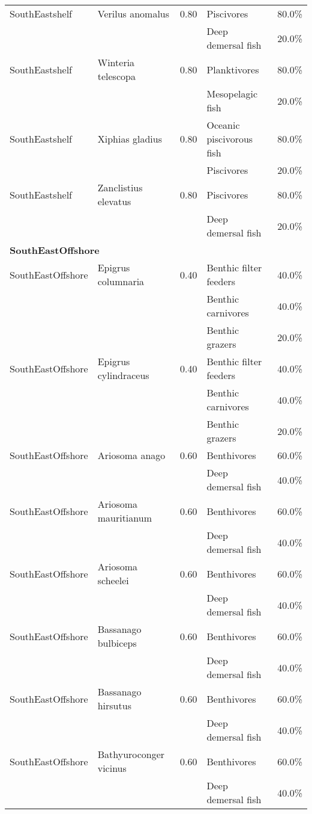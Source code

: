 \begin{longtable}{llcll}
\hline
SouthEastshelf & Verilus anomalus & 0.80 & Piscivores & 80.0\% \\
& & & Deep demersal fish & 20.0\% \\
\hline
SouthEastshelf & Winteria telescopa & 0.80 & Planktivores & 80.0\% \\
& & & Mesopelagic fish & 20.0\% \\
\hline
SouthEastshelf & Xiphias gladius & 0.80 & Oceanic piscivorous fish & 80.0\% \\
& & & Piscivores & 20.0\% \\
\hline
SouthEastshelf & Zanclistius elevatus & 0.80 & Piscivores & 80.0\% \\
& & & Deep demersal fish & 20.0\% \\
\hline
\hline
\multicolumn{5}{l}{\textbf{SouthEastOffshore}} \\
\hline
SouthEastOffshore & Epigrus columnaria & 0.40 & Benthic filter feeders & 40.0\% \\
& & & Benthic carnivores & 40.0\% \\
& & & Benthic grazers & 20.0\% \\
\hline
SouthEastOffshore & Epigrus cylindraceus & 0.40 & Benthic filter feeders & 40.0\% \\
& & & Benthic carnivores & 40.0\% \\
& & & Benthic grazers & 20.0\% \\
\hline
SouthEastOffshore & Ariosoma anago & 0.60 & Benthivores & 60.0\% \\
& & & Deep demersal fish & 40.0\% \\
\hline
SouthEastOffshore & Ariosoma mauritianum & 0.60 & Benthivores & 60.0\% \\
& & & Deep demersal fish & 40.0\% \\
\hline
SouthEastOffshore & Ariosoma scheelei & 0.60 & Benthivores & 60.0\% \\
& & & Deep demersal fish & 40.0\% \\
\hline
SouthEastOffshore & Bassanago bulbiceps & 0.60 & Benthivores & 60.0\% \\
& & & Deep demersal fish & 40.0\% \\
\hline
SouthEastOffshore & Bassanago hirsutus & 0.60 & Benthivores & 60.0\% \\
& & & Deep demersal fish & 40.0\% \\
\hline
SouthEastOffshore & Bathyuroconger vicinus & 0.60 & Benthivores & 60.0\% \\
& & & Deep demersal fish & 40.0\% \\

\end{longtable}
